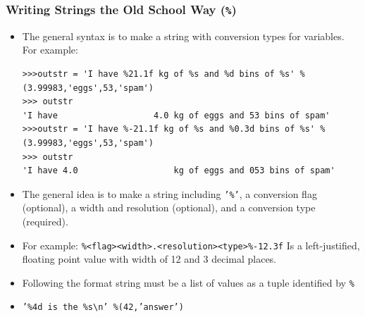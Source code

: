 \documentclass{beamer}
\begin{document}
\begin{frame}[fragile]
\frametitle{Writing Strings the Old School Way (\texttt{\%})}
\begin{itemize}
\item The general syntax is to make a string with conversion types for variables. For example:
\begin{lstlisting}
>>>outstr = 'I have %21.1f kg of %s and %d bins of %s' %(3.99983,'eggs',53,'spam')
>>> outstr
'I have                   4.0 kg of eggs and 53 bins of spam'
>>>outstr = 'I have %-21.1f kg of %s and %0.3d bins of %s' %(3.99983,'eggs',53,'spam')
>>> outstr
'I have 4.0                   kg of eggs and 053 bins of spam'

\end{lstlisting}
\item The general idea is to make a string including \texttt{'\%'}, a conversion flag (optional), a width and resolution (optional), and a conversion type (required).
\item[] For example: \texttt{\%<flag><width>.<resolution><type>}\newline{}\texttt{\%-12.3f} Is a left-justified, floating point value with width of 12 and 3 decimal places.
\item Following the format string must be a list of values as a tuple identified by \texttt{\%}
\item[] \texttt{'\%4d is the \%s\textbackslash{}n' \%(42,'answer')}
\end{itemize}
\end{frame}
\end{document}
